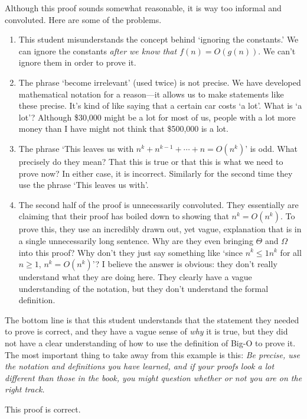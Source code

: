 \begin{eval}
\begin{ssolenum}
\noindent
\evallinethree
\end{ssolenum}
\begin{answer}
\begin{solevalenum}
\item
Although this proof sounds somewhat reasonable, it is way too informal and convoluted.  Here are
some of the problems.
\begin{enumerate}
\item
This student misunderstands the concept behind `ignoring the constants.'
We can ignore the constants {\em after we know that $f(n)=O(g(n))$}.  We can't ignore them
in order to prove it.
\item
The phrase `become irrelevant' (used twice) is not precise.  
We have developed mathematical notation for
a reason---it allows us to make statements like these precise.
It's kind of like saying that a certain car costs `a lot'.  What is `a lot'?
Although \$30,000 might be a lot for most of us, people with a lot more money
than I have might not think that \$500,000 is a lot.
\item
The phrase `This leaves us with $n^k+n^{k-1}+\cdots+n=O(n^k)$' is odd.  What precisely do they mean?
That this is true or that this is what we need to prove now?  In either case, it is incorrect.
Similarly for the second time they use the phrase `This leaves us with'.
\item
The second half of the proof is unnecessarily convoluted.  They essentially are claiming that their
proof has boiled down to showing that $n^k=O(n^k)$.  
To prove this, they use an incredibly drawn out, yet vague, explanation that is 
in a single unnecessarily long sentence.  Why are they even bringing $\Theta$ and $\Omega$ into this proof?  
Why don't they just say something like `since $n^k\leq 1n^k$ for all $n\geq 1$, $n^k=O(n^k)$'?  
I believe the answer is obvious:  they don't really understand what they are doing here.  
They clearly have a vague understanding of the notation, but they don't understand the 
formal definition.
\end{enumerate}
The bottom line is that this student understands that the statement they needed to prove is correct,
and they have a vague sense of {\em why} it is true, but they did not have a clear understanding
of how to use the definition of Big-O to prove it.
The most important thing to take away from this example is this:  
{\em Be precise, use the notation and
definitions you have learned, and if your proofs look a lot different than those in the book, you
might question whether or not you are on the right track.}
\item
This proof is correct.
\end{solevalenum}
\end{answer}
\end{eval}

